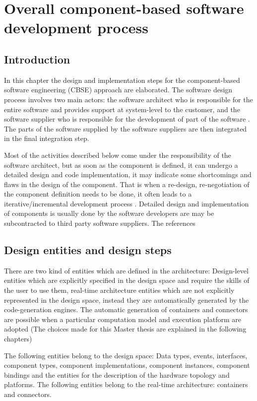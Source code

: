 
\chapter{Overall component-based software development process}
\label{chap: Software development process}
\section{Introduction}
In this chapter the design and implementation steps for the component-based software engineering (CBSE) approach are elaborated. The software design process involves two main actors: the software architect who is responsible for the entire software and provides support at system-level to the customer, and the software supplier who is responsible for the development of part of the software \cite{CompBasedProcess}. The parts of the software supplied by the software suppliers are then integrated in the final integration step.

Most of the activities described below come under the responsibility of the software architect, but as soon as the component is defined, it can undergo a detailed design and code implementation, it may indicate some shortcomings and flaws in the design of the component. That is when a re-design, re-negotiation of the component definition needs to be done, it often leads to a iterative/incremental development process \cite{ScheduAnaly}. Detailed design and implementation of components is usually done by the software developers are may be subcontracted to third party software suppliers. The references 

\section{Design entities and design steps}
There are two kind of entities which are defined in the architecture: Design-level entities which are explicitly specified in the design space and require the skills of the user to use them, real-time architecture entities which are not explicitly represented in the design space, instead they are automatically generated by the code-generation engines. The automatic generation of containers and connectors are possible when a particular computation model and execution platform are adopted (The choices made for this Master thesis are explained in the following chapters)  

The following entities belong to the design space: Data types, events, interfaces, component types, component implementations, component instances, component bindings and the entities for the description of the hardware topology and platforms. The following entities belong to the real-time architecture: containers and connectors.

